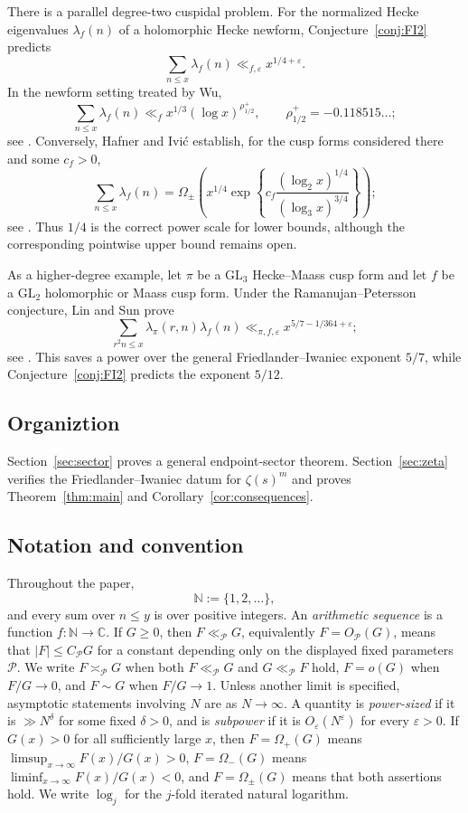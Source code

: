 \documentclass[11pt]{amsart}
\theoremstyle{plain}
\theoremstyle{definition}
\theoremstyle{remark}
\numberwithin{equation}{section}
\begin{document}
There is a parallel degree-two cuspidal problem. For the normalized
Hecke eigenvalues $\lambda_f(n)$ of a holomorphic Hecke newform,
Conjecture~\ref{conj:FI2} predicts
\[
  \sum_{n\le x}\lambda_f(n)
  \ll_{f,\varepsilon}x^{1/4+\varepsilon}.
\]
In the newform setting treated by Wu,
\[
  \sum_{n\le x}\lambda_f(n)
  \ll_f
  x^{1/3}(\log x)^{\rho_{1/2}^{+}},
  \qquad
  \rho_{1/2}^{+}=-0.118515\ldots;
\]
see \cite[Theorem~2]{Wu}. Conversely, Hafner and Ivi\'c establish,
for the cusp forms considered there and some $c_f>0$,
\[
  \sum_{n\le x}\lambda_f(n)
  =
  \Omega_\pm\!\left(
    x^{1/4}
    \exp\!\left\{
      c_f\frac{(\log_2x)^{1/4}}{(\log_3x)^{3/4}}
    \right\}
  \right);
\]
see \cite[Theorem~2]{HafnerIvic}. Thus $1/4$ is the correct
power scale for lower bounds, although the corresponding pointwise
upper bound remains open.

As a higher-degree example, let $\pi$ be a $\mathrm{GL}_3$
Hecke--Maass cusp form and let $f$ be a $\mathrm{GL}_2$ holomorphic
or Maass cusp form. Under the Ramanujan--Petersson conjecture,
Lin and Sun prove
\[
  \sum_{r^2n\le x}
  \lambda_\pi(r,n)\lambda_f(n)
  \ll_{\pi,f,\varepsilon}
  x^{5/7-1/364+\varepsilon};
\]
see \cite[Corollary~1.4]{LinSun}. This saves a power over the general
Friedlander--Iwaniec exponent $5/7$, while
Conjecture~\ref{conj:FI2} predicts the exponent $5/12$.

\subsection{Organiztion}
Section~\ref{sec:sector} proves a general endpoint-sector theorem.
Section~\ref{sec:zeta} verifies the Friedlander--Iwaniec datum for
$\zeta(s)^m$ and proves Theorem~\ref{thm:main} and
Corollary~\ref{cor:consequences}.  
\subsection{Notation and convention}
Throughout the paper,
\[
  \mathbb N:=\{1,2,\ldots\},
\]
and every sum over $n\le y$ is over positive integers.  An \emph{arithmetic
sequence} is a function $f:\mathbb N\to\mathbb C$.   If $G\ge0$, then
$F\ll_{\mathcal P}G$, equivalently $F=O_{\mathcal P}(G)$, means that
$|F|\le C_{\mathcal P}G$ for a constant depending only on the displayed fixed
parameters $\mathcal P$.  We write $F\asymp_{\mathcal P}G$ when both
$F\ll_{\mathcal P}G$ and $G\ll_{\mathcal P}F$ hold, $F=o(G)$ when
$F/G\to0$, and $F\sim G$ when $F/G\to1$.  Unless another limit is specified,
asymptotic statements involving $N$ are as $N\to\infty$.  A quantity is
\emph{power-sized} if it is $\gg N^\delta$ for some fixed $\delta>0$, and is
\emph{subpower} if it is $O_\varepsilon(N^\varepsilon)$ for every
$\varepsilon>0$.  If $G(x)>0$ for all sufficiently large $x$, then
$F=\Omega_+(G)$ means $\limsup_{x\to\infty}F(x)/G(x)>0$,
$F=\Omega_-(G)$ means $\liminf_{x\to\infty}F(x)/G(x)<0$, and
$F=\Omega_\pm(G)$ means that both assertions hold.  We write $\log_j$ for
the $j$-fold iterated natural logarithm.
\end{document}
